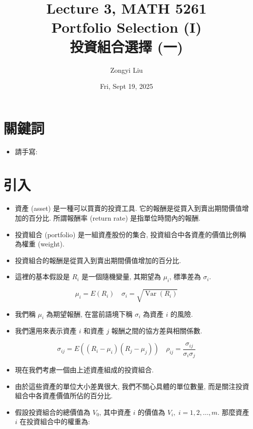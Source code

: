\documentclass[letterpaper]{article}
\title{Lecture 3, MATH 5261 \\
		\small{Portfolio Selection (I) \\
			投資組合選擇 (一)
		}
	}
\author{Zongyi Liu}
\date{Fri, Sept 19, 2025}
\begin{document}
		\maketitle
		
		\tableofcontents
		
		\section{關鍵詞}
		\begin{itemize}
			\item 請手寫: 
		\end{itemize}
		
		\section{引入}
		\begin{itemize}
			\item 資產 (asset) 是一種可以買賣的投資工具. 它的報酬是從買入到賣出期間價值增加的百分比. 所謂報酬率 (return rate) 是指單位時間內的報酬. 
			\item 投資組合 (portfolio) 是一組資產股份的集合, 投資組合中各資產的價值比例稱為權重 (weight).
			\item 投資組合的報酬是從買入到賣出期間價值增加的百分比.
			\item 這裡的基本假設是 $R_{i}$ 是一個隨機變量, 其期望為 $\mu_{i}$, 標準差為 $\sigma_{i}$.
		\end{itemize}
		
		$$
		\mu_{i}=E\left (R_{i}\right) \quad \sigma_{i}=\sqrt{\operatorname{Var}\left (R_{i}\right)}
		$$
		
		\begin{itemize}
			\item 我們稱 $\mu_{i}$ 為期望報酬, 在當前語境下稱 $\sigma_{i}$ 為資產 $i$ 的風險. 
			\item 我們還用來表示資產 $i$ 和資產 $j$ 報酬之間的協方差與相關係數.
		\end{itemize}
		
		$$
		\sigma_{i j}=E\left (\left (R_{i}-\mu_{i}\right)\left (R_{j}-\mu_{j}\right)\right) \quad \rho_{i j}=\frac{\sigma_{i j}}{\sigma_{i} \sigma_{j}}
		$$
		
		\begin{itemize}
			\item 現在我們考慮一個由上述資產組成的投資組合. 
			\item 由於這些資產的單位大小差異很大, 我們不關心具體的單位數量, 而是關注投資組合中各資產價值所佔的百分比. 
			\item 假設投資組合的總價值為 $V_{0}$, 其中資產 $i$ 的價值為 $V_{i}, \; i=1, 2, \ldots, m$. 那麼資產 $i$ 在投資組合中的權重為: 
		\end{itemize}
		
\end{document}
